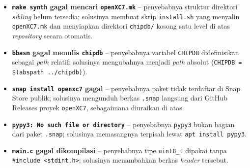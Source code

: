 \begin{itemize}
	\item \textbf{\texttt{make synth} gagal mencari \texttt{openXC7.mk}} -- penyebabnya struktur direktori \textit{sibling} belum tersedia; solusinya membuat skrip \texttt{install.sh} yang menyalin \texttt{openXC7.mk} dan menyiapkan direktori \texttt{chipdb/} kosong satu level di atas \textit{repository} secara otomatis.
	\item \textbf{\texttt{bbasm} gagal menulis \texttt{chipdb}} -- penyebabnya variabel \texttt{CHIPDB} didefinisikan sebagai \textit{path} relatif; solusinya mengubahnya menjadi \textit{path} absolut (\texttt{CHIPDB = \$(abspath ../chipdb)}).
	\item \textbf{\texttt{snap install openxc7} gagal} -- penyebabnya paket tidak terdaftar di Snap Store publik; solusinya mengunduh berkas \texttt{.snap} langsung dari GitHub Releases proyek \texttt{openXC7}, sebagaimana diuraikan di atas.
	\item \textbf{\texttt{pypy3: No such file or directory}} -- penyebabnya \texttt{pypy3} bukan bagian dari paket \texttt{.snap}; solusinya memasangnya terpisah lewat \texttt{apt install pypy3}.
	\item \textbf{\texttt{main.c} gagal dikompilasi} -- penyebabnya tipe \texttt{uint8\_t} dipakai tanpa \texttt{\#include <stdint.h>}; solusinya menambahkan berkas \textit{header} tersebut.
\end{itemize}
